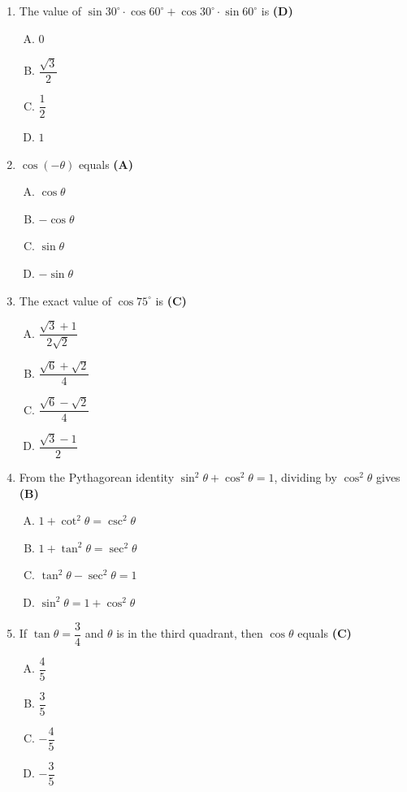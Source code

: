 \documentclass[10pt,a4paper]{article}
\begin{document}
\begin{enumerate}[1.]

\item The value of $\sin 30^\circ \cdot \cos 60^\circ + \cos 30^\circ \cdot \sin 60^\circ$ is \hfill \textbf{(D)}
\begin{enumerate}[(A)]
    \item $0$
    \item $\dfrac{\sqrt{3}}{2}$
    \item $\dfrac{1}{2}$
    \item $1$
\end{enumerate}

\item $\cos(-\theta)$ equals \hfill \textbf{(A)}
\begin{enumerate}[(A)]
    \item $\cos\theta$
    \item $-\cos\theta$
    \item $\sin\theta$
    \item $-\sin\theta$
\end{enumerate}

\item The exact value of $\cos 75^\circ$ is \hfill \textbf{(C)}
\begin{enumerate}[(A)]
    \item $\dfrac{\sqrt{3}+1}{2\sqrt{2}}$
    \item $\dfrac{\sqrt{6}+\sqrt{2}}{4}$
    \item $\dfrac{\sqrt{6}-\sqrt{2}}{4}$
    \item $\dfrac{\sqrt{3}-1}{2}$
\end{enumerate}

\item From the Pythagorean identity $\sin^2\theta + \cos^2\theta = 1$, dividing by $\cos^2\theta$ gives \hfill \textbf{(B)}
\begin{enumerate}[(A)]
    \item $1 + \cot^2\theta = \csc^2\theta$
    \item $1 + \tan^2\theta = \sec^2\theta$
    \item $\tan^2\theta - \sec^2\theta = 1$
    \item $\sin^2\theta = 1 + \cos^2\theta$
\end{enumerate}

\item If $\tan\theta = \dfrac{3}{4}$ and $\theta$ is in the third quadrant, then $\cos\theta$ equals \hfill \textbf{(C)}
\begin{enumerate}[(A)]
    \item $\dfrac{4}{5}$
    \item $\dfrac{3}{5}$
    \item $-\dfrac{4}{5}$
    \item $-\dfrac{3}{5}$
\end{enumerate}


\end{enumerate}
\end{document}
